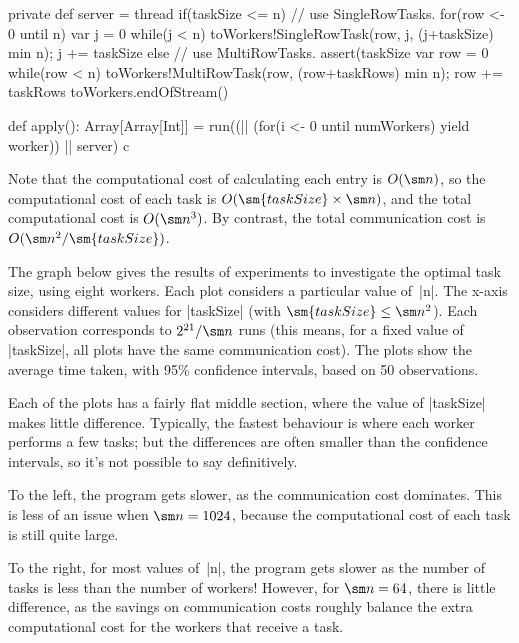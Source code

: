 \begin{answerI}
\begin{scala}
{  private def server = thread{
    if(taskSize <= n){ // use SingleRowTasks.
      for(row <- 0 until n){
        var j = 0
        while(j < n){ 
          toWorkers!SingleRowTask(row, j, (j+taskSize) min n); j += taskSize
        }
      }
    }
    else{ // use MultiRowTasks.
      assert(taskSize%
      var row = 0
      while(row < n){
        toWorkers!MultiRowTask(row, (row+taskRows) min n); row += taskRows
      }
    }
    toWorkers.endOfStream()
  }

  def apply(): Array[Array[Int]] = {
    run((|| (for(i <- 0 until numWorkers) yield worker)) || server)
    c
  }
}
\end{scala}


Note that the computational cost of calculating each entry is $O(\sm n)$, so
the computational cost of each task is $O(\sm{taskSize} \times \sm n)$, and
the total computational cost is $O(\sm n^3)$.  By contrast, the total
communication cost is $O(\sm n^2 / \sm{taskSize})$.

The graph below gives the results of experiments to investigate the optimal
task size, using eight workers.  Each plot considers a particular value
of~|n|.  The x-axis considers different values for |taskSize| (with
$\sm{taskSize} \le \sm n^2$).  Each observation corresponds to $2^{21}/\sm n$
runs (this means, for a fixed value of |taskSize|, all plots have the same
communication cost).  The plots show the average time taken, with 95\%
confidence intervals, based on 50 observations.

\begin{center}

\end{center}

Each of the plots has a fairly flat middle section, where the value of
|taskSize| makes little difference.  Typically, the fastest behaviour is where
each worker performs a few tasks; but the differences are often smaller than
the confidence intervals, so it's not possible to say definitively.

To the left, the program gets slower, as the communication cost dominates.
This is less of an issue when $\sm n = 1024$, because the computational cost
of each task is still quite large.

To the right, for most values of~|n|, the program gets slower as the number of
tasks is less than the number of workers!  However, for $\sm n = 64$, there is
little difference, as the savings on communication costs roughly balance the
extra computational cost for the workers that receive a task. 
\end{answerI}

